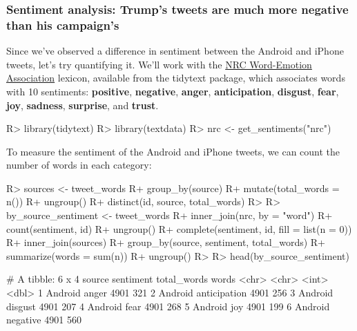 \documentclass[
]{jss}
\begin{document}
\hypertarget{sentiment-analysis-trumps-tweets-are-much-more-negative-than-his-campaigns}{%
\subsubsection{Sentiment analysis: Trump's tweets are much more negative
than his
campaign's}\label{sentiment-analysis-trumps-tweets-are-much-more-negative-than-his-campaigns}}

Since we've observed a difference in sentiment between the Android and
iPhone tweets, let's try quantifying it. We'll work with the
\href{http://saifmohammad.com/WebPages/NRC-Emotion-Lexicon.htm}{NRC
Word-Emotion Association} lexicon, available from the tidytext package,
which associates words with 10 sentiments: \textbf{positive},
\textbf{negative}, \textbf{anger}, \textbf{anticipation},
\textbf{disgust}, \textbf{fear}, \textbf{joy}, \textbf{sadness},
\textbf{surprise}, and \textbf{trust}.

\begin{CodeChunk}

\begin{CodeInput}
R> library(tidytext)
R> library(textdata)
R> nrc <- get_sentiments("nrc")
\end{CodeInput}
\end{CodeChunk}

To measure the sentiment of the Android and iPhone tweets, we can count
the number of words in each category:

\begin{CodeChunk}

\begin{CodeInput}
R> sources <- tweet_words %
R+   group_by(source) %
R+   mutate(total_words = n()) %
R+   ungroup() %
R+   distinct(id, source, total_words)
R> 
R> by_source_sentiment <- tweet_words %
R+   inner_join(nrc, by = "word") %
R+   count(sentiment, id) %
R+   ungroup() %
R+   complete(sentiment, id, fill = list(n = 0)) %
R+   inner_join(sources) %
R+   group_by(source, sentiment, total_words) %
R+   summarize(words = sum(n)) %
R+   ungroup()
R> 
R> head(by_source_sentiment)
\end{CodeInput}

\begin{CodeOutput}
# A tibble: 6 x 4
  source  sentiment    total_words words
  <chr>   <chr>              <int> <dbl>
1 Android anger               4901   321
2 Android anticipation        4901   256
3 Android disgust             4901   207
4 Android fear                4901   268
5 Android joy                 4901   199
6 Android negative            4901   560
\end{CodeOutput}
\end{CodeChunk}
\end{document}
